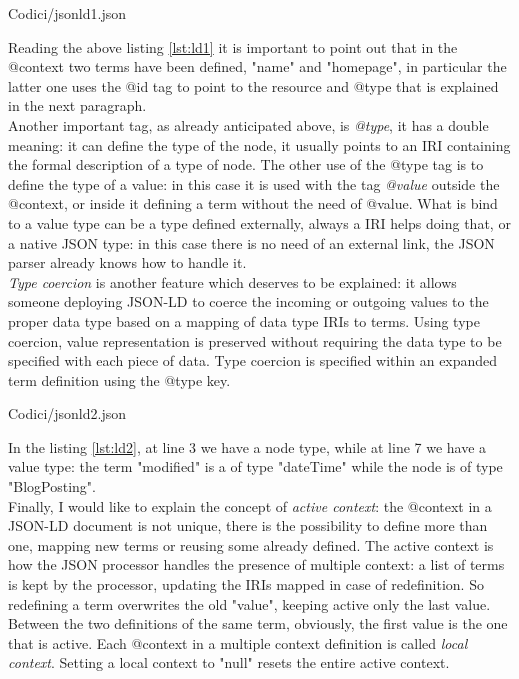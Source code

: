 \begin{lstinputlisting}[
    morekeywords={ciao, @context, name, homepage, @id, @type, bye},
		caption={JSON-LD: @context, @id example},
		label=lst:ld1]
		{Codici/jsonld1.json}
\end{lstinputlisting}

Reading the above listing \ref{lst:ld1} it is important to point out that in the @context two terms have been defined, "name" and "homepage", in particular the latter one uses the @id tag to point to the resource and @type that is explained in the next paragraph. \\
Another important tag, as already anticipated above, is \textit{@type}, it has a double meaning: it can define the type of the node, it usually points to an IRI containing the formal description of a type of node. The other use of the @type tag is to define the type of a value: in this case it is used with the tag \textit{@value} outside the @context, or inside it defining a term without the need of @value. What is bind to a value type can be a type defined externally, always a IRI helps doing that, or a native JSON type: in this case there is no need of an external link, the JSON parser already knows how to handle it. \\
\textit{Type coercion} is another feature which deserves to be explained: it allows someone deploying JSON-LD to coerce the incoming or outgoing values to the proper data type based on a mapping of data type IRIs to terms. Using type coercion, value representation is preserved without requiring the data type to be specified with each piece of data. Type coercion is specified within an expanded term definition using the @type key.

\begin{lstinputlisting}[
    morekeywords={ciao, @context, name, modified, @id, @type, @value, bye},
		caption={JSON-LD: @type for node and value example},
		label=lst:ld2]
		{Codici/jsonld2.json}
\end{lstinputlisting}

In the listing \ref{lst:ld2}, at line 3 we have a node type, while at line 7 we have a value type: the term "modified" is a of type "dateTime" while the node is of type "BlogPosting". \\
Finally, I would like to explain the concept of \textit{active context}: the @context in a JSON-LD document is not unique, there is the possibility to define more than one, mapping new terms or reusing some already defined. The active context is how the JSON processor handles the presence of multiple context: a list of terms is kept by the processor, updating the IRIs mapped in case of redefinition. So redefining a term overwrites the old "value", keeping active only the last value. Between the two definitions of the same term, obviously, the first value is the one that is active. Each @context in a multiple context definition is called \textit{local context}. Setting a local context to "null" resets the entire active context.

